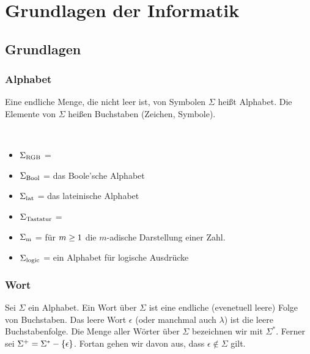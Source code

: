 \part{Grundlagen der Informatik}
\chapter{Grundlagen}
\section{Alphabet}
\begin{definition}[Alphabet]
Eine endliche Menge, die nicht leer ist, von Symbolen $\Sigma$ heißt Alphabet. Die Elemente von $\Sigma$ heißen Buchstaben (Zeichen, Symbole).
\label{def:Alphabet}
\end{definition}

\begin{example}~
\begin{itemize}
\item $\Sigma_{\text{RGB}}$ = 
\item $\Sigma_{\text{Bool}}$ =  das Boole'sche Alphabet
\item $\Sigma_{\text{lat}}$ =  das lateinische Alphabet
\item $\Sigma_{\text{Tastatur}}$ = 
\item $\Sigma_{\text{m}}$ =   für $m \geq 1$ die $m$-adische Darstellung einer Zahl.
\item $\Sigma_{\text{logic}}$ =  ein Alphabet für logische Ausdrücke
\end{itemize}
\end{example}

\section{Wort}
\begin{definition}[Wort]
Sei $\Sigma$ ein Alphabet. Ein Wort über $\Sigma$ ist eine endliche (evenetuell leere) Folge von Buchstaben. Das leere Wort $\epsilon$ (oder manchmal auch $\lambda$) ist die leere Buchstabenfolge. Die Menge aller Wörter über $\Sigma$ bezeichnen wir mit $\Sigma^*$. Ferner sei $\Sigma^+ = \Sigma^* - \left\{\epsilon\right\}$. Fortan gehen wir davon aus, dass $\epsilon \notin \Sigma$ gilt.
\label{def:Wort}
\end{definition}

